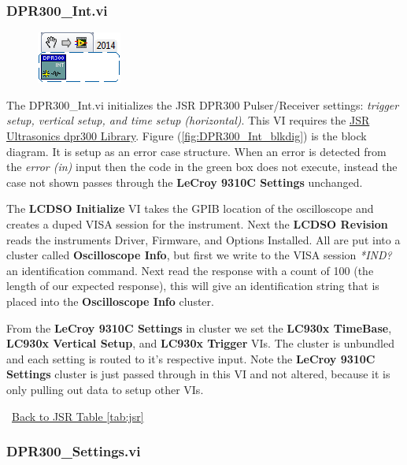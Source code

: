 \documentclass[11pt,a4paper,oldfontcommands]{memoir}
\begin{document}
\subsubsection{DPR300\_Int.vi} \label{DPR300_Int}
\noindent\hrulefill

\begin{figure}[h]
	\includegraphics[scale=0.625]{DPR300_Int_main_02}
	\label{fig:DPR300_Int_main_02}
\end{figure}

The DPR300\_Int.vi initializes the JSR DPR300 Pulser/Receiver settings: \textit{trigger setup, vertical setup, and time setup (horizontal)}. This VI requires the \href{http://sine.ni.com/apps/utf8/niid_web_display.model_page?p_model_id=5819}{JSR Ultrasonics dpr300 Library}. Figure (\ref{fig:DPR300_Int_blkdig}) is the block diagram.  It is setup as an error case structure. When an error is detected from the \textit{error (in)} input then the code in the green box does not execute, instead the case not shown passes through the \textbf{LeCroy 9310C Settings} unchanged.

The \textbf{LCDSO Initialize} VI takes the GPIB location of the oscilloscope and creates a duped VISA session for the instrument. Next the \textbf{LCDSO Revision} reads the instruments Driver, Firmware, and Options Installed. All are put into a cluster called \textbf{Oscilloscope Info}, but first we write to the VISA session \textit{*IND?} an identification command. Next read the response with a count of 100 (the length of our expected response), this will give an identification string that is placed into the \textbf{Oscilloscope Info} cluster.

From the \textbf{LeCroy 9310C Settings} in cluster we set the \textbf{LC930x TimeBase}, \textbf{LC930x Vertical Setup}, and \textbf{LC930x Trigger} VIs. The cluster is unbundled and each setting is routed to it's respective input. Note the \textbf{LeCroy 9310C Settings} cluster is just passed through in this VI and not altered, because it is only pulling out data to setup other VIs.

\noindent\hrulefill\, \hyperref[tab:jsr]{Back to JSR Table \ref{tab:jsr}}

\subsubsection{DPR300\_Settings.vi} \label{DPR300_settings}
\noindent\hrulefill
\end{document}
